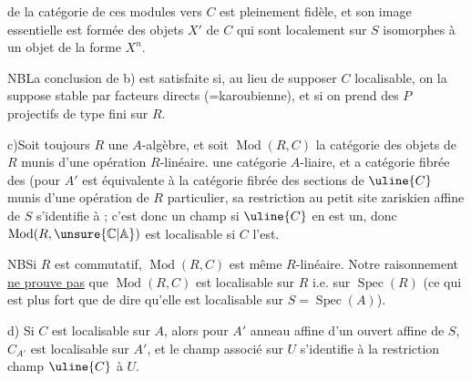 de la catégorie de ces modules vers $C$ est pleinement fidèle, et son image essentielle est formée des objets $X'$ de $C$ qui sont localement sur $S$ isomorphes à un objet de la forme $X^n$.

NB\quad La conclusion de b) est satisfaite si, au lieu de supposer $C$ localisable, on la suppose stable par facteurs directs (=karoubienne), et  si on prend des $P$ projectifs de type fini sur $R$.

c)\quad Soit toujours $R$ une $A$-algèbre,  et soit $\operatorname{Mod}(R,C)$ la catégorie des objets de $R$ munis d'une opération $R$-linéaire.  une catégorie $A$-liaire, et a catégorie fibrée des
(pour $A'$   est équivalente à la catégorie fibrée des sections de $\uline{C}$ munis d'une opération de $R$  particulier, sa restriction au  petit site zariskien affine de $S$  s'identifie à
; c'est donc un champ si $\uline{C}$ en est un, donc $\operatorname{Mod}(R,\unsure{\mathbb{C}|\mathbb{A}})$ est localisable  si $C$ l'est.

NB\quad Si $R$ est commutatif, $\operatorname{Mod}(R,C)$ est même $R$-linéaire. Notre raisonnement \uline{ne prouve pas} que  $\operatorname{Mod}(R,C)$ est localisable sur $R$ i.e. sur $\operatorname{Spec}(R)$ (ce qui est plus fort que de dire qu'elle est localisable sur $S=\operatorname{Spec}(A)$).

d)\quad {} Si $C$ est localisable sur $A$, alors pour $A'$  anneau affine d'un ouvert affine  de $S$, $C_{A'}$ est localisable sur $A'$, et le champ associé sur $U$ s'identifie à la restriction  champ $\uline{C}$ à $U$.

